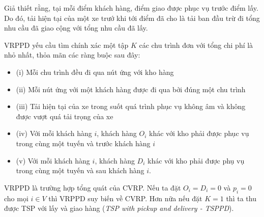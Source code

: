 Giả thiết rằng, tại mỗi điểm khách hàng, điểm giao được phục vụ trước điểm lấy. Do đó, tải hiện tại của một xe trướ khi tới điểm đã cho là tải ban đầu trừ đi tổng nhu cầu đã giao cộng với tổng nhu cầu đã lấy.

VRPPD yếu cầu tìm chính xác một tập $K$ các chu trình đơn với tổng chi phí là nhỏ nhất, thỏa mãn các ràng buộc sau đây:

\begin{itemize}
  \item[] (i) Mỗi chu trình đều đi qua nút ứng với kho hàng
  \item[] (ii) Mỗi nút ứng với một khách hàng được đi qua bởi đúng một chu trình
  \item[] (iii) Tải hiện tại của xe trong suốt quá trình phục vụ không âm và không được vượt quá tải trọng của xe
  \item[] (iv) Với mỗi khách hàng $i$, khách hàng $O_i$ khác với kho phải được phục vụ trong cùng một tuyến và trước khách hàng $i$
  \item[] (v) Với mỗi khách hàng $i$, khách hàng $D_i$ khác với kho phải được phụ vụ trong cùng một tuyến và sau khách hàng $i$.
\end{itemize}

VRPPD là trường hợp tổng quát của CVRP. Nếu ta đặt $O_i = D_i = 0$ và $p_i = 0$ cho mọi $i \in V$ thì VRPPD suy biến về CVRP. Hơn nữa nếu đặt $K=1$ thì ta thu được TSP với lấy và giao hàng (\textit{TSP with pickup and delivery - TSPPD}).
